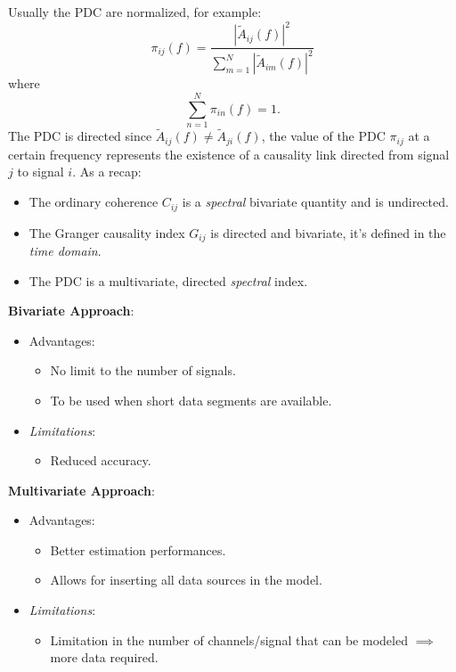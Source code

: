 \documentclass[10pt, letterpaper]{report}
\begin{document}
Usually the PDC are normalized, for example:\begin{equation}
     \pi_{ij}(f)=\frac{|\tilde A_{ij}(f)|^2}{\sum_{m=1}^N |\tilde A_{im}(f)|^2}
\end{equation}
where\begin{equation}
     \sum_{n=1}^N\pi_{in}(f)=1.
\end{equation}
The PDC is directed since $\tilde A_{ij}(f)\ne\tilde A_{ji}(f)$, the value of the PDC $\pi_{ij}$ at a certain frequency represents the existence
of a causality link directed from signal $j$ to signal $i$. As a recap:\begin{itemize}
     \item The ordinary coherence $C_{ij}$ is a \textit{spectral} bivariate quantity and is undirected.
     \item The Granger causality index $G_{ij}$ is directed and bivariate, it's  defined in the \textit{time domain}. 
     \item The PDC is a multivariate, directed \textit{spectral} index.
\end{itemize}
\textbf{Bivariate Approach}:\begin{itemize}
     \item Advantages:\begin{itemize}
          \item No limit to the number of signals.
          \item To be used when short data segments are available.
     \end{itemize}
     \item \textit{Limitations}:\begin{itemize}
          \item Reduced accuracy.
     \end{itemize}
\end{itemize}
\textbf{Multivariate Approach}:\begin{itemize}
     \item Advantages:\begin{itemize}
          \item Better estimation performances.
          \item Allows for inserting all data sources in the model.
     \end{itemize}
     \item \textit{Limitations}:\begin{itemize}
          \item Limitation in the number of channels/signal that can be
modeled $\implies$ more data required.
     \end{itemize}
\end{itemize}
\end{document}
